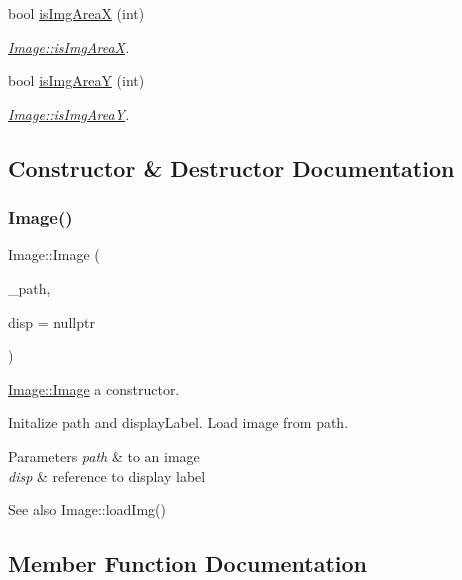 \begin{DoxyCompactItemize}
bool \mbox{\hyperlink{class_image_a176645fd2b8695127beb87861a3bff05}{is\+Img\+AreaX}} (int)
\begin{DoxyCompactList}\small\item\em \mbox{\hyperlink{class_image_a176645fd2b8695127beb87861a3bff05}{Image\+::is\+Img\+AreaX}}. \end{DoxyCompactList}\item 
bool \mbox{\hyperlink{class_image_ae54b7b084b648d561244ec047565c1fb}{is\+Img\+AreaY}} (int)
\begin{DoxyCompactList}\small\item\em \mbox{\hyperlink{class_image_ae54b7b084b648d561244ec047565c1fb}{Image\+::is\+Img\+AreaY}}. \end{DoxyCompactList}\end{DoxyCompactItemize}


\subsection{Constructor \& Destructor Documentation}
\mbox{\label{class_image_aeb23ee6bbcab6102860403d6fa66565d}} 
\subsubsection{\texorpdfstring{Image()}{Image()}}
{\footnotesize\ttfamily Image\+::\+Image (\begin{DoxyParamCaption}\item[{Q\+String}]{\+\_\+path,  }\item[{Q\+Label $\ast$}]{disp = {\ttfamily nullptr} }\end{DoxyParamCaption})}



\mbox{\hyperlink{class_image_a58edd1c45b4faeb5f789b0d036d02313}{Image\+::\+Image}} a constructor. 

Initalize path and display\+Label. Load image from path. 
\begin{DoxyParams}{Parameters}
{\em path} & to an image \\
\hline
{\em disp} & reference to display label \\
\hline
\end{DoxyParams}
\begin{DoxySeeAlso}{See also}
Image\+::load\+Img() 
\end{DoxySeeAlso}


\subsection{Member Function Documentation}
\mbox{\label{class_image_a5ed60b8ab5bece73fd951c3a23071c04}} 
